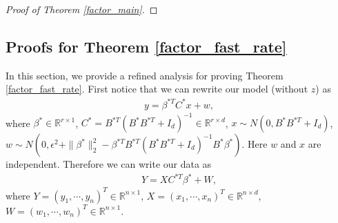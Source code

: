 \begin{proof}[Proof of Theorem \ref{factor_main}]

\end{proof}


\subsection{Proofs for Theorem \ref{factor_fast_rate}} \label{fast_rate}
In this section, we provide a refined analysis for proving Theorem \ref{factor_fast_rate}. First notice that we can rewrite our model (without $z$) as 
\begin{align}
y=\beta^{* T}C^{*}x+w,   
\end{align}
where $\beta^{*} \in \mathbb{R}^{r \times 1}$, $C^{*}=B^{* T}(B^{*}B^{* T}+I_{d})^{-1}\in \mathbb{R}^{r \times d}$, $x \sim N(0, B^{*}B^{* T}+I_{d})$, $w \sim N(0,\epsilon^{2}+\|\beta^{*}\|_{2}^{2}-\beta^{* T}B^{* T}(B^{*}B^{* T}+I_{d})^{-1}B^{*}\beta^{*})$. Here $w$ and $x$ are independent. Therefore we can write our data as 
\begin{align}
Y=XC^{* T}\beta^{*} + W, 
\end{align}
where $Y=(y_1,\cdots,y_n)^{T}\in \mathbb{R}^{n \times 1}$, $X=(x_{1},\cdots,x_{n})^{T}\in \mathbb{R}^{n \times d}$, $W=(w_1,\cdots,w_n)^{T}\in \mathbb{R}^{n \times 1}$. 

